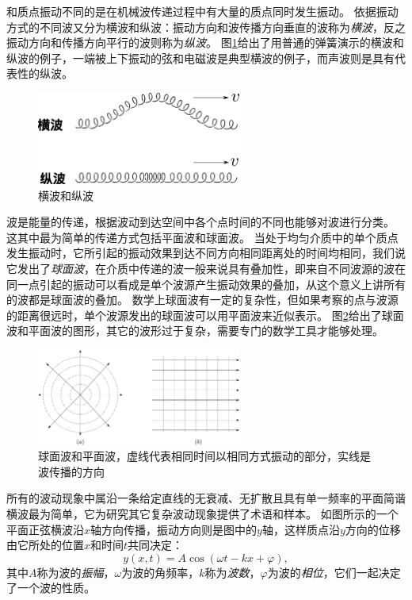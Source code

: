 和质点振动不同的是在机械波传递过程中有大量的质点同时发生振动。
依据振动方式的不同波又分为横波和纵波：振动方向和波传播方向垂直的波称为\emph{横波}，反之振动方向和传播方向平行的波则称为\emph{纵波}。
图\ref{fig: ow-横波和纵波}给出了用普通的弹簧演示的横波和纵波的例子，一端被上下振动的弦和电磁波是典型横波的例子，而声波则是具有代表性的纵波。

\begin{figure}[hbtp]
\centering
\includegraphics[width=0.6\textwidth]{images/ow-1.pdf}
\caption{横波和纵波}\label{fig: ow-横波和纵波}
\end{figure}

波是能量的传递，根据波动到达空间中各个点时间的不同也能够对波进行分类。
这其中最为简单的传递方式包括平面波和球面波。
当处于均匀介质中的单个质点发生振动时，它所引起的振动效果到达不同方向相同距离处的时间均相同，我们说它发出了\emph{球面波}，在介质中传递的波一般来说具有叠加性，即来自不同波源的波在同一点引起的振动可以看成是单个波源产生振动效果的叠加，从这个意义上讲所有的波都是球面波的叠加。
数学上球面波有一定的复杂性，但如果考察的点与波源的距离很远时，单个波源发出的球面波可以用平面波来近似表示。
图\ref{fig: ow-球面波的平面波}给出了球面波和平面波的图形，其它的波形过于复杂，需要专门的数学工具才能够处理。

\begin{figure}[hbtp]
\centering
\includegraphics[width=0.6\textwidth]{images/ow-2.pdf} 
\caption{球面波和平面波，虚线代表相同时间以相同方式振动的部分，实线是波传播的方向}\label{fig: ow-球面波的平面波}
\end{figure}

所有的波动现象中属沿一条给定直线的无衰减、无扩散且具有单一频率的平面简谐横波最为简单，它为研究其它复杂波动现象提供了术语和样本。
如图所示的一个平面正弦横波沿$x$轴方向传播，振动方向则是图中的$y$轴，这样质点沿$y$方向的位移由它所处的位置$x$和时间$t$共同决定：
\begin{equation}\label{eqn: ow-最简单的横波}
y(x,t) = A\cos(\omega t-k x +\varphi),
\end{equation}
其中$A$称为波的\emph{振幅}，$\omega$为波的角频率，$k$称为\emph{波数}，$\varphi$为波的\emph{相位}，它们一起决定了一个波的性质。


